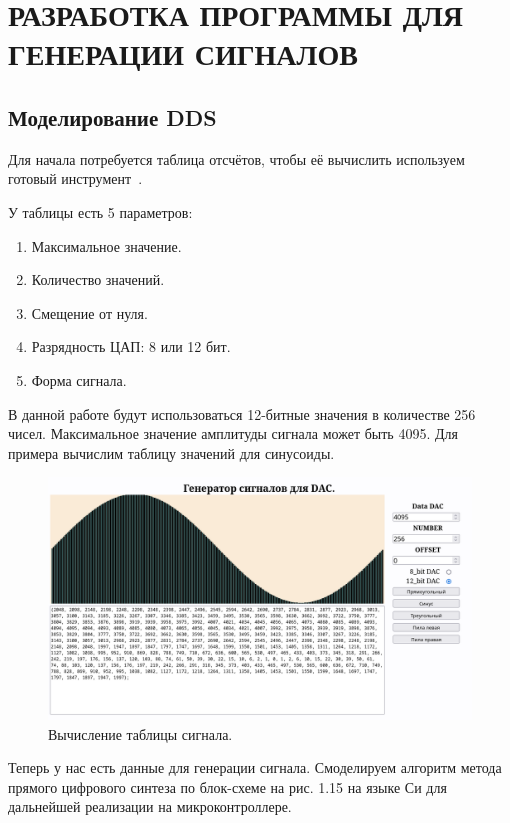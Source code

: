 \chapter{РАЗРАБОТКА ПРОГРАММЫ ДЛЯ ГЕНЕРАЦИИ СИГНАЛОВ}
\section{Моделирование DDS}
Для начала потребуется таблица отсчётов, чтобы её вычислить используем готовый инструмент~\cite{lut}.
	
	
	У таблицы есть 5 параметров:
	\begin{enumerate}
		\item Максимальное значение.
		\item Количество значений.
		\item Смещение от нуля.
		\item Разрядность ЦАП: 8 или 12 бит.
		\item Форма сигнала.
	\end{enumerate}
	
	В данной работе будут использоваться 12-битные значения в количестве 256 чисел. Максимальное значение амплитуды сигнала может быть 4095. Для примера вычислим таблицу значений для синусоиды.
	
	\begin{figure}[H]
    \centering
    \includegraphics[width=1\textwidth]{../image/lut.png}
    \caption{Вычисление таблицы сигнала.}
	\end{figure}
	
	Теперь у нас есть данные для генерации сигнала. Смоделируем алгоритм метода прямого цифрового синтеза по блок-схеме на рис. 1.15 на языке Си для дальнейшей реализации на микроконтроллере.

